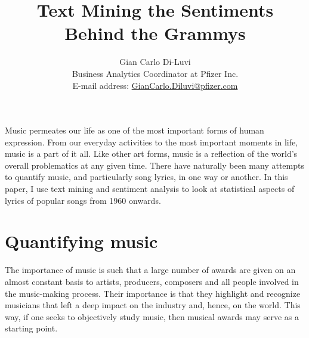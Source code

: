 \documentclass{article}
\begin{document}
\title{\vspace{-1.2cm}Text Mining the Sentiments Behind the Grammys}
\author{Gian Carlo Di-Luvi \\
{\normalsize Business Analytics Coordinator at Pfizer Inc.} \\
{\normalsize E-mail address: \href{mailto:giancarlo.diluvi@pfizer.com}{GianCarlo.Diluvi@pfizer.com}}}
\date{}

\maketitle


Music permeates our life as one of the most important forms of human expression. From our everyday activities to the most important moments in life, music is a part of it all. Like other art forms, music is a reflection of the world's overall problematics at any given time. There have naturally been many attempts to quantify music, and particularly song lyrics, in one way or another. In this paper, I use text mining and sentiment analysis to look at statistical aspects of lyrics of popular songs from 1960 onwards.










\section*{Quantifying music}


The importance of music is such that a large number of awards are given on an almost constant basis to artists, producers, composers and all people involved in the music-making process. Their importance is that they highlight and recognize musicians that left a deep impact on the industry and, hence, on the world. This way, if one seeks to objectively study music, then musical awards may serve as a starting point. \\
\end{document}
